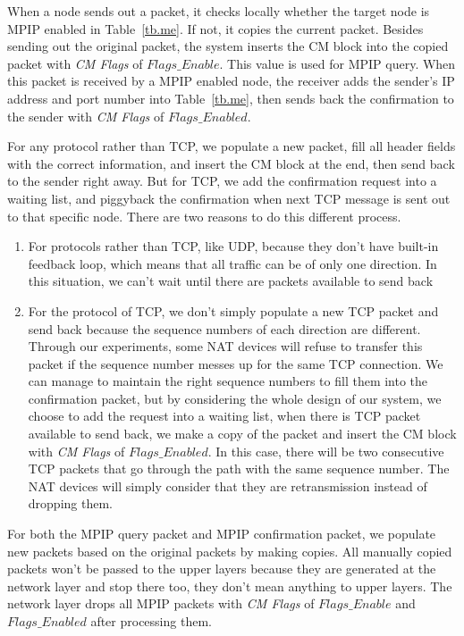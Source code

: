 When a node sends out a packet, it checks locally whether the target node is MPIP enabled in Table~\ref{tb.me}. If not, it 
copies the current packet. Besides sending out the original packet, the system inserts the CM block into the copied packet with \emph{CM Flags} of $Flags\_Enable$. This value is used for MPIP query. When this packet is received by a MPIP enabled node, the receiver adds the sender's IP address and port number into Table~\ref{tb.me}, then sends back the confirmation to the sender with \emph{CM Flags} of $Flags\_Enabled$.

For any protocol rather than TCP, we populate a new packet, fill all header fields with the correct information, and insert the CM block at the end, then send back to the sender right away. But for TCP, we add the confirmation request into a waiting list, and piggyback the confirmation when next TCP message is sent out to that specific node. There are two reasons to do this different process. 

\begin{enumerate}
\item For protocols rather than TCP, like UDP, because they don't have built-in feedback loop, which means that all traffic can be of only one direction. In this situation, we can't wait until there are packets available to send back 

\item For the protocol of TCP, we don't simply populate a new TCP packet and send back because the sequence numbers of each direction are different. Through our experiments, some NAT devices will refuse to transfer this packet if the sequence number messes up for the same TCP connection. We can manage to maintain the right sequence numbers to fill them into the confirmation packet, but by considering the whole design of our system, we choose to add the request into a waiting list, when there is TCP packet available to send back, we make a copy of the packet and insert the CM block with \emph{CM Flags} of $Flags\_Enabled$. In this case, there will be two consecutive TCP packets that go through the path with the same sequence number. The NAT devices will simply consider that they are retransmission instead of dropping them.
\end{enumerate}

For both the MPIP query packet and MPIP confirmation packet, we populate new packets based on the original packets by making copies. All manually copied packets won't be passed to the upper layers because they are generated at the network layer and stop there too, they don't mean anything to upper layers. The network layer drops all MPIP packets with \emph{CM Flags} of $Flags\_Enable$ and $Flags\_Enabled$ after processing them.

